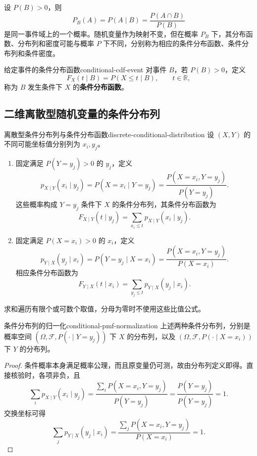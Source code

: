 设 $P(B)>0$，则
\[
P_B(A)=P(A\mid B)=\frac{P(A\cap B)}{P(B)}
\]
是同一事件域上的一个概率。随机变量作为映射不变，但在概率 $P_B$ 下，其分布函数、分布列和密度可能与概率 $P$ 下不同，分别称为相应的条件分布函数、条件分布列和条件密度。

\begin{mydefinition}{给定事件的条件分布函数}{conditional-cdf-event}
对事件 $B$，若 $P(B)>0$，定义
\[
F_X(t\mid B)=P(X\leq t\mid B),\qquad t\in\mathbb R,
\]
称为 $B$ 发生条件下 $X$ 的\textbf{条件分布函数}。
\end{mydefinition}

\subsection*{二维离散型随机变量的条件分布列}

\begin{mydefinition}{离散型条件分布列与条件分布函数}{discrete-conditional-distribution}
设 $(X,Y)$ 的不同可能坐标值分别列为 $x_i,y_j$。
\begin{enumerate}
\item 固定满足 $P(Y=y_j)>0$ 的 $y_j$，定义
\[
p_{X\mid Y}(x_i\mid y_j)=P(X=x_i\mid Y=y_j)
=\frac{P(X=x_i,Y=y_j)}{P(Y=y_j)}.
\]
这些概率构成 $Y=y_j$ 条件下 $X$ 的条件分布列，其条件分布函数为
\[
F_{X\mid Y}(t\mid y_j)=\sum_{x_i\leq t}p_{X\mid Y}(x_i\mid y_j).
\]
\item 固定满足 $P(X=x_i)>0$ 的 $x_i$，定义
\[
p_{Y\mid X}(y_j\mid x_i)=P(Y=y_j\mid X=x_i)
=\frac{P(X=x_i,Y=y_j)}{P(X=x_i)}.
\]
相应条件分布函数为
\[
F_{Y\mid X}(t\mid x_i)=\sum_{y_j\leq t}p_{Y\mid X}(y_j\mid x_i).
\]
\end{enumerate}
求和遍历有限个或可数个取值，分母为零时不使用这些比值公式。
\end{mydefinition}

\begin{proposition}{条件分布列的归一化}{conditional-pmf-normalization}
上述两种条件分布列，分别是概率空间 $(\Omega,\mathcal F,P(\cdot\mid Y=y_j))$ 下 $X$ 的分布列，以及 $(\Omega,\mathcal F,P(\cdot\mid X=x_i))$ 下 $Y$ 的分布列。
\end{proposition}
\begin{proof}
条件概率本身满足概率公理，而且原变量仍可测，故由分布列定义即得。直接核验时，各项非负，且
\[
\sum_i p_{X\mid Y}(x_i\mid y_j)
=\frac{\sum_iP(X=x_i,Y=y_j)}{P(Y=y_j)}
=\frac{P(Y=y_j)}{P(Y=y_j)}=1.
\]
交换坐标可得
\[
\sum_jp_{Y\mid X}(y_j\mid x_i)
=\frac{\sum_jP(X=x_i,Y=y_j)}{P(X=x_i)}=1.
\]
\end{proof}


